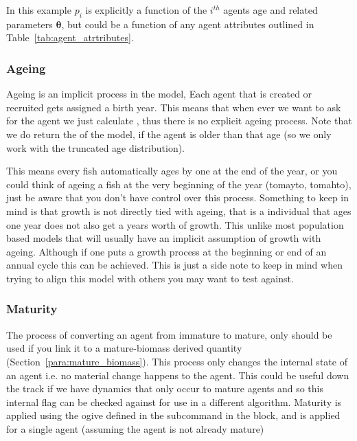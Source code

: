 In this example \(p_i\) is explicitly a function of the \(i^{th}\) agents age and related parameters \(\bm{\theta}\), but could be a function of any agent attributes outlined in Table~\ref{tab:agent_atrtributes}.

\subsubsection{Ageing}

Ageing is an implicit process in the model, Each agent that is created or recruited gets assigned a birth year. This means that when ever we want to ask for the agent we just calculate , thus there is no explicit ageing process. Note that we do return the  of the model, if the agent is older than that age (so we only work with the truncated age distribution).


This means every fish automatically ages by one at the end of the year, or you could think of ageing a fish at the very beginning of the year (tomayto, tomahto), just be aware that you don't have control over this process. Something to keep in mind is that growth is not directly tied with ageing, that is a individual that ages one year does not also get a years worth of growth. This unlike most population based models that will usually have an implicit assumption of growth with ageing. Although if one puts a growth process at the beginning or end of an annual cycle this can be achieved. This is just a side note to keep in mind when trying to align this model with others you may want to test against.


\subsubsection{Maturity}\label{subsubsec:maturity}
The process of converting an agent from immature to mature, only should be used if you link it to a mature-biomass derived quantity (Section~\ref{para:mature_biomass}). This process only changes the internal state of an agent i.e. no material change happens to the agent. This could be useful down the track if we have dynamics that only occur to mature agents and so this internal flag can be checked against for use in a different algorithm. Maturity is applied using the ogive defined in the subcommand  in the  block, and is applied for a single agent (assuming the agent is not already mature)

